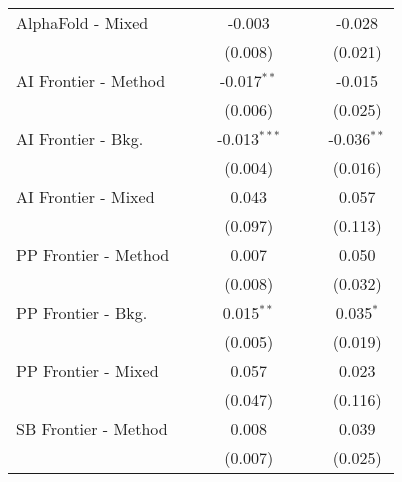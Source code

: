 \begin{tabular}{lcccccc}
   AlphaFold - Mixed    &                &                & -0.003         &                &                & -0.028\\   
                        &                &                & (0.008)        &                &                & (0.021)\\   
   AI Frontier - Method &                &                & -0.017$^{**}$  &                &                & -0.015\\   
                        &                &                & (0.006)        &                &                & (0.025)\\   
   AI Frontier - Bkg.   &                &                & -0.013$^{***}$ &                &                & -0.036$^{**}$\\   
                        &                &                & (0.004)        &                &                & (0.016)\\   
   AI Frontier - Mixed  &                &                & 0.043          &                &                & 0.057\\   
                        &                &                & (0.097)        &                &                & (0.113)\\   
   PP Frontier - Method &                &                & 0.007          &                &                & 0.050\\   
                        &                &                & (0.008)        &                &                & (0.032)\\   
   PP Frontier - Bkg.   &                &                & 0.015$^{**}$   &                &                & 0.035$^{*}$\\   
                        &                &                & (0.005)        &                &                & (0.019)\\   
   PP Frontier - Mixed  &                &                & 0.057          &                &                & 0.023\\   
                        &                &                & (0.047)        &                &                & (0.116)\\   
   SB Frontier - Method &                &                & 0.008          &                &                & 0.039\\   
                        &                &                & (0.007)        &                &                & (0.025)\\   

\end{tabular}
